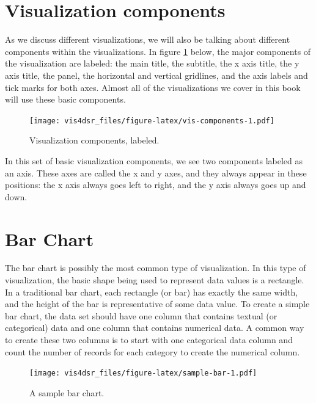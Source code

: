 \documentclass[
]{krantz}
\begin{document}
\hypertarget{visualization-components}{%
\section{Visualization components}\label{visualization-components}}

As we discuss different visualizations, we will also be talking about different
components within the visualizations. In figure \ref{fig:vis-components} below,
the major components of the visualization are labeled: the main title, the subtitle,
the x axis title, the y axis title, the panel, the horizontal and vertical gridlines,
and the axis labels and tick marks for both axes. Almost all of the visualizations we cover
in this book will use these basic components.

\begin{figure}
\centering
\texttt{[image: vis4dsr\_files/figure-latex/vis-components-1.pdf]}
\caption{\label{fig:vis-components}Visualization components, labeled.}
\end{figure}

In this set of basic visualization components, we see two components labeled as an axis.
These axes are called the x and y axes, and they always appear in these positions:
the x axis always goes left to right, and the y axis always goes up and down.

\hypertarget{bar-chart}{%
\section{Bar Chart}\label{bar-chart}}

The bar chart is possibly the most common type of visualization. In this type
of visualization, the basic shape being used to represent data values is a rectangle.
In a traditional bar chart, each rectangle (or bar) has exactly the same width,
and the height of the bar is representative of some data value. To create a simple
bar chart, the data set should have one column that contains textual (or categorical)
data and one column that contains numerical data. A common way to create these two columns
is to start with one categorical data column and count the number of records for each
category to create the numerical column.

\begin{figure}
\centering
\texttt{[image: vis4dsr\_files/figure-latex/sample-bar-1.pdf]}
\caption{\label{fig:sample-bar}A sample bar chart.}
\end{figure}
\end{document}

